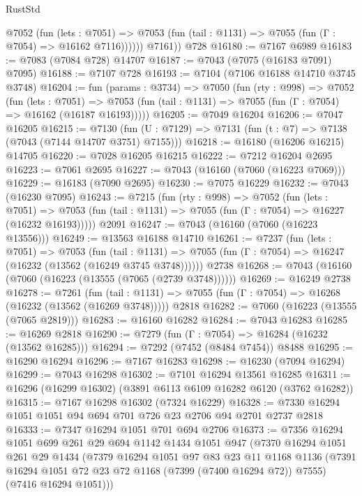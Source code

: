 \begin{lexlean}{RustStd}
\begin{coremodule}
            @7052
              (fun (lets : @7051) =>
              @7053 (fun (tail : @1131) => @7055 (fun (Γ : @7054) => @16162 @7116))))))
        @7161))
    @728
@16180 := @7167 @6989
@16183 := @7083 (@7084 @728) @14707
@16187 := @7043 (@7075 (@16183 @7091) @7095)
@16188 := @7107 @728
@16193 := @7104 (@7106 @16188 @14710 @3745 @3748)
@16204 := fun (params : @3734) =>
  @7050
    (fun (rty : @998) =>
    @7052
      (fun (lets : @7051) =>
      @7053 (fun (tail : @1131) => @7055 (fun (Γ : @7054) => @16162 (@16187 @16193)))))
@16205 := @7049 @16204
@16206 := @7047 @16205
@16215 := @7130
    (fun (U : @7129) => @7131 (fun (t : @7) => @7138 (@7043 (@7144 @14707 @3751) @7155)))
@16218 := @16180 (@16206 @16215) @14705
@16220 := @7028 @16205 @16215
@16222 := @7212 @16204 @2695
@16223 := @7061 @2695
@16227 := @7043 (@16160 (@7060 (@16223 @7069)))
@16229 := @16183 (@7090 @2695)
@16230 := @7075 @16229
@16232 := @7043 (@16230 @7095)
@16243 := @7215
    (fun (rty : @998) =>
    @7052
      (fun (lets : @7051) =>
      @7053 (fun (tail : @1131) => @7055 (fun (Γ : @7054) => @16227 (@16232 @16193)))))
    @2091
@16247 := @7043 (@16160 (@7060 (@16223 @13556)))
@16249 := @13563 @16188 @14710
@16261 := @7237
    (fun (lets : @7051) =>
    @7053
      (fun (tail : @1131) =>
      @7055 (fun (Γ : @7054) => @16247 (@16232 (@13562 (@16249 @3745 @3748))))))
    @2738
@16268 := @7043 (@16160 (@7060 (@16223 (@13555 (@7065 (@2739 @3748))))))
@16269 := @16249 @2738
@16278 := @7261
    (fun (tail : @1131) => @7055 (fun (Γ : @7054) => @16268 (@16232 (@13562 (@16269 @3748)))))
    @2818
@16282 := @7060 (@16223 (@13555 (@7065 @2819)))
@16283 := @16160 @16282
@16284 := @7043 @16283
@16285 := @16269 @2818
@16290 := @7279 (fun (Γ : @7054) => @16284 (@16232 (@13562 @16285)))
@16294 := @7292 (@7452 (@8484 @7454)) @8488
@16295 := @16290 @16294
@16296 := @7167 @16283
@16298 := @16230 (@7094 @16294)
@16299 := @7043 @16298
@16302 := @7101 @16294 @13561 @16285
@16311 := @16296 (@16299 @16302) (@3891 @6113 @6109 @16282 @6120 (@3762 @16282))
@16315 := @7167 @16298 @16302 (@7324 @16229)
@16328 := @7330 @16294 @1051 @1051 @94 @694 @701 @726 @23 @2706 @94 @2701 @2737 @2818
@16333 := @7347 @16294 @1051 @701 @694 @2706
@16373 := @7356
    @16294
    @1051
    @699
    @261
    @29
    @694
    @1142
    @1434
    @1051
    @947
    (@7370
      @16294
      @1051
      @261
      @29
      @1434
      (@7379
        @16294
        @1051
        @97
        @83
        @23
        @11
        @1168
        @1136
        (@7391 @16294 @1051 @72 @23 @72 @1168 (@7399 (@7400 @16294 @72)) @7555)
        (@7416 @16294 @1051)))

\end{coremodule}
\end{lexlean}
